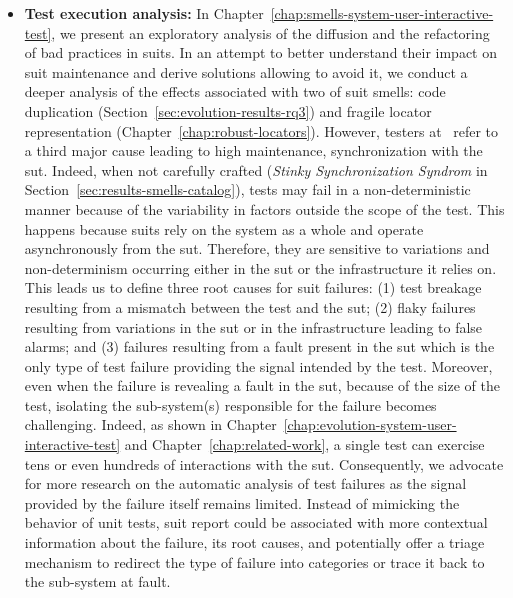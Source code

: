 \begin{itemize}
    \item \textbf{Test execution analysis:} In Chapter~\ref{chap:smells-system-user-interactive-test}, we present an exploratory analysis of the diffusion and the refactoring of bad practices in \gls{suit}s. In an attempt to better understand their impact on \gls{suit} maintenance and derive solutions allowing to avoid it, we conduct a deeper analysis of the effects associated with two of \gls{suit} smells: code duplication (Section~\ref{sec:evolution-results-rq3}) and fragile locator representation (Chapter~\ref{chap:robust-locators}). However, testers at \BGL\ refer to a third major cause leading to high maintenance, synchronization with the \gls{sut}. Indeed, when not carefully crafted (\eg \emph{Stinky Synchronization Syndrom} in Section~\ref{sec:results-smells-catalog}), tests may fail in a non-deterministic manner because of the variability in factors outside the scope of the test. This happens because \gls{suit}s rely on the system as a whole and operate asynchronously from the \gls{sut}. Therefore, they are sensitive to variations and non-determinism occurring either in the \gls{sut} or the infrastructure it relies on. This leads us to define three root causes for \gls{suit} failures: (1) test breakage resulting from a mismatch between the test and the \gls{sut}; (2) flaky failures resulting from variations in the \gls{sut} or in the infrastructure leading to false alarms; and (3) failures resulting from a fault present in the \gls{sut} which is the only type of test failure providing the signal intended by the test. Moreover, even when the failure is revealing a fault in the \gls{sut}, because of the size of the test, isolating the sub-system(s) responsible for the failure becomes challenging. Indeed, as shown in Chapter~\ref{chap:evolution-system-user-interactive-test} and Chapter~\ref{chap:related-work}, a single test can exercise tens or even hundreds of interactions with the \gls{sut}. Consequently, we advocate for more research on the automatic analysis of test failures as the signal provided by the failure itself remains limited. Instead of mimicking the behavior of unit tests, \gls{suit} report could be associated with more contextual information about the failure, its root causes, and potentially offer a triage mechanism to redirect the type of failure into categories or trace it back to the sub-system at fault.
\end{itemize}
